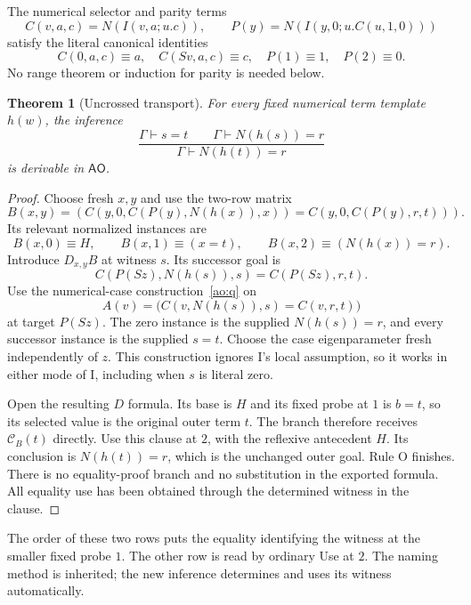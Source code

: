 \documentclass[11pt,letterpaper]{article}
\newtheorem{theorem}{Theorem}[section]
\theoremstyle{definition}
\begin{document}
The numerical selector and parity terms
\[
 C(v,a,c)=N(I(v,a;u.c)),\qquad
 P(y)=N(I(y,0;u.C(u,1,0)))
\]
satisfy the literal canonical identities
\[
 C(0,a,c)\equiv a,\quad C(Sv,a,c)\equiv c,
 \quad P(1)\equiv1,\quad P(2)\equiv0.
\]
No range theorem or induction for parity is needed below.

\begin{theorem}[Uncrossed transport]
\label{ao:transport}
For every fixed numerical term template $h(w)$, the inference
\[
 \frac{\Gamma\vdash s=t\qquad\Gamma\vdash N(h(s))=r}
      {\Gamma\vdash N(h(t))=r}
\]
is derivable in $\mathsf{AO}$.
\end{theorem}
\begin{proof}
Choose fresh $x,y$ and use the two-row matrix
\[
 B(x,y)=\left(
 C(y,0,C(P(y),N(h(x)),x))
 =C(y,0,C(P(y),r,t))\right).
 \tag{Rows}\label{ao:rows}
\]
Its relevant normalized instances are
\[
 B(x,0)\equiv H,\qquad
 B(x,1)\equiv(x=t),\qquad
 B(x,2)\equiv(N(h(x))=r).
\]
Introduce $D_{x,y}B$ at witness $s$.  Its successor goal is
\[
 C(P(Sz),N(h(s)),s)=C(P(Sz),r,t).
\]
Use the numerical-case construction~\eqref{ao:q} on
\[
 A(v)=\bigl(C(v,N(h(s)),s)=C(v,r,t)\bigr)
\]
at target $P(Sz)$.  The zero instance is the supplied $N(h(s))=r$,
and every successor instance is the supplied $s=t$.  Choose the case
eigenparameter fresh independently of $z$.  This construction ignores
I's local assumption, so it works in either mode of I, including when
$s$ is literal zero.

Open the resulting $D$ formula.  Its base is $H$ and its fixed probe at
$1$ is $b=t$, so its selected value is the original outer term $t$.
The branch therefore receives $\mathcal C_B(t)$ directly.  Use this
clause at $2$, with the reflexive antecedent $H$.  Its conclusion is
$N(h(t))=r$, which is the unchanged outer goal.  Rule O finishes.
There is no equality-proof branch and no substitution in the exported
formula.  All equality use has been obtained through the determined
witness in the clause.
\end{proof}

The order of these two rows puts the equality identifying the witness at
the smaller fixed probe $1$.  The other row is read by ordinary Use at
$2$.  The naming method is inherited; the new inference determines and
uses its witness automatically.
\end{document}
